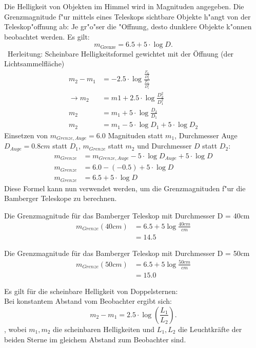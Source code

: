 Die Helligkeit von Objekten im Himmel wird in Magnituden angegeben. Die Grenzmagnitude f"ur mittels eines Teleskops sichtbare Objekte h"angt von der Teleskop"offnung ab: Je gr"o"ser die "Offnung, desto dunklere Objekte k"onnen beobachtet werden. Es gilt: 
\begin{equation}
m_{\mathrm{Grenze}}=6.5 + 5\cdot \log D. 
\end{equation}\
Herleitung: 
Scheinbare Helligkeitsformel gewichtet mit der Öffnung (der Lichtsammelfläche)
\begin{align*}
m_2-m_1&=-2.5 \cdot\log \frac{\frac{F_2}{D_2^2}}{\frac{F_1}{D_1^2}}\\
\rightarrow m_2&=m1+2.5\cdot\log\frac{D_2^2}{D_1^2}\\
m_2&=m_1+5\cdot \log \frac{D_2}{D_1}\\
m_2&=m_1-5\cdot\log D_1 +5\cdot\log D_2
\end{align*}
Einsetzen von $m_{Grenze,Auge}=6.0$ Magnituden statt $m_1$, Durchmesser Auge $D_{Auge} = 0.8cm$ statt $D_1$, $m_{Grenze}$ statt $m_2$ und Durchmesser $D$ statt $D_2$:
\begin{align*}
m_{Grenze}&=m_{Grenze, Auge}-5\cdot\log D_{Auge} +5\cdot\log D\\
m_{Grenze}&=6.0-(-0.5) +5\cdot\log D\\
m_{Grenze}&=6.5 + 5\cdot \log D
\end{align*}
Diese Formel kann nun verwendet werden, um die Grenzmagnituden f"ur die Bamberger Teleskope zu berechnen. 

Die Grenzmagnitude für das Bamberger Teleskop mit Durchmesser D = 40cm
\begin{align*}
m_{Grenze} (40cm)&= 6.5 + 5 \log \frac{40cm}{cm}\\
&= 14.5
\end{align*}

Die Grenzmagnitude für das Bamberger Teleskop mit Durchmesser D = 50cm
\begin{align*}
m_{Grenze} (50cm)&= 6.5 + 5 \log \frac{50cm}{cm}\\
&= 15.0
\end{align*}


Es gilt für die scheinbare Helligkeit von Doppelsternen: \\
Bei konstantem Abstand vom Beobachter ergibt sich: 
\begin{equation}
m_2 - m_1 = 2.5\cdot \log(\frac{L_1}{L_2}). 
\end{equation}, 
wobei $m_1, m_2$ die scheinbaren Helligkeiten und $L_1, L_2$  die Leuchtkräfte der beiden Sterne im gleichem Abstand zum Beobachter sind.

